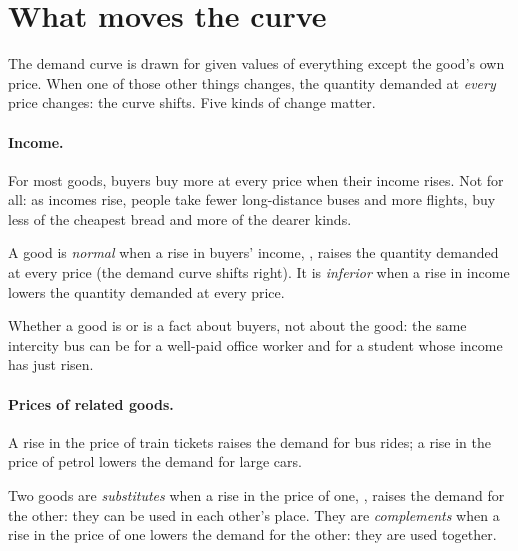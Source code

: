 \section{What moves the curve}\label{sec:g10:demand:shifts}

The demand curve is drawn for given values of everything except the good's own price. When one of those other things
changes, the quantity demanded at \emph{every} price changes: the curve shifts. Five kinds of change matter.

\paragraph{Income.} For most goods, buyers buy more at every price when their income rises. Not for all: as incomes rise,
people take fewer long-distance buses and more flights, buy less of the cheapest bread and more of the dearer kinds.

\begin{definition}\label{def:g10:demand:normal}
A good is \emph{normal} when a rise in buyers' income, , raises the quantity demanded
at every price (the demand curve shifts right). It is \emph{inferior} when a rise in income lowers the
quantity demanded at every price.
\end{definition}
\label{def:g10:demand:inferior}

Whether a good is  or  is a fact about buyers, not about the good: the same intercity bus can be 
for a well-paid office worker and  for a student whose income has just risen.

\paragraph{Prices of related goods.} A rise in the price of train tickets raises the demand for bus rides; a rise in the
price of petrol lowers the demand for large cars.

\begin{definition}\label{def:g10:demand:substitutes}
Two goods are \emph{substitutes} when a rise in the price of one, , raises the demand
for the other: they can be used in each other's place. They are \emph{complements} when a rise in the
price of one lowers the demand for the other: they are used together.
\end{definition}
\label{def:g10:demand:complements}

